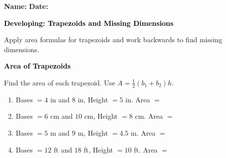 \documentclass[12pt, letterpaper, fleqn]{article}
\newcommand{\blank}{\underline{\hspace{2.2cm}}}
\begin{document}
\textbf{Name:} \underline{\hspace{5cm}}
\hfill
\textbf{Date:} \underline{\hspace{3cm}}\\

\begin{tcolorbox}[colback=black!10]
    \large\textcolor{black}{\textbf{Developing: Trapezoids and Missing Dimensions}}
\end{tcolorbox}

\vspace{3mm}

\noindent
Apply area formulas for trapezoids and work backwards to find missing dimensions.

\vspace{4mm}

\begin{tcolorbox}[colback=black!10]
\large\textcolor{black}{\textbf{Area of Trapezoids}}
\end{tcolorbox}

\noindent
Find the area of each trapezoid. Use $A = \frac{1}{2}(b_1 + b_2)h$.

\vspace{3mm}

\begin{enumerate}[itemsep=2.2cm, leftmargin=0.6cm]

\item Bases $= 4$ in and $8$ in, Height $= 5$ in. \quad Area $=$ \blank

\vspace{1.5cm}

\item Bases $= 6$ cm and $10$ cm, Height $= 8$ cm. \quad Area $=$ \blank

\vspace{1.5cm}

\item Bases $= 5$ m and $9$ m, Height $= 4.5$ m. \quad Area $=$ \blank

\vspace{1.5cm}

\item Bases $= 12$ ft and $18$ ft, Height $= 10$ ft. \quad Area $=$ \blank

\vspace{1.5cm}

\end{enumerate}
\end{document}
